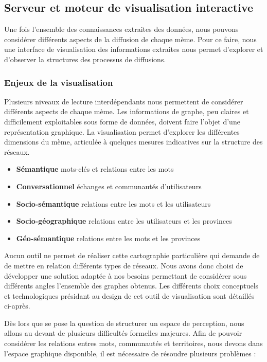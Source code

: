 \subsection{Serveur et moteur de visualisation interactive}


Une fois l'ensemble des connaissances extraites des données, nous pouvons considérer différents aspects de la diffusion de chaque  mème. Pour ce faire, nous une interface de visualisation des informations extraites nous permet d'explorer et d'observer la structures des processus de diffusions.

\subsubsection{Enjeux de la visualisation} %
\label{ssub:enjeux_de_la_visualisation}

Plusieurs niveaux de lecture interdépendants nous permettent de considérer différents aspects de chaque mème. Les informations de graphe, peu claires et difficilement exploitables sous forme de données, doivent faire l'objet d'une représentation graphique. La visualisation permet d{\textquoteright}explorer les différentes dimensions du mème, articulée à quelques mesures indicatives sur la structure des réseaux.

\begin{itemize}
    \item \textbf{Sémantique} mots-clés et relations entre les mots
    \item \textbf{Conversationnel} échanges et communautés d{\textquoteright}utilisateurs 
    \item \textbf{Socio-sémantique} relations entre les mots et les utilisateurs
    \item \textbf{Socio-géographique} relations entre les utilisateurs et les provinces
    \item \textbf{Géo-sémantique} relations entre les mots et les provinces
\end{itemize}


Aucun outil ne permet de réaliser cette cartographie particulière qui demande de de mettre en relation différents types de réseaux. Nous avons donc choisi de développer une solution adaptée à nos besoins permettant de considérer sous différents angles l{\textquoteright}ensemble des graphes obtenus. Les différents choix conceptuels et technologiques présidant au design de cet outil de visualisation sont détaillés ci-après. 

Dès lors que se pose la question de structurer un espace de perception, nous allons au devant de plusieurs difficultés formelles majeures. Afin de pouvoir considérer les relations entres mots, communautés et
territoires, nous devons dans l{\textquoteright}espace graphique
disponible, il est nécessaire de résoudre plusieurs problèmes :


